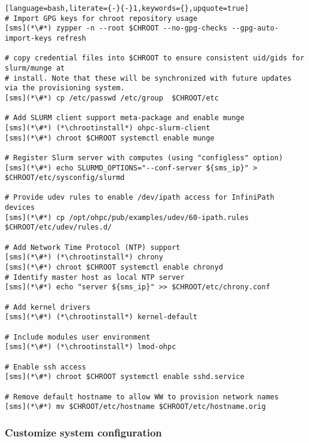 \documentclass[letterpaper]{article}
\newcommand{\chrootinstall}{zypper -n --root \$CHROOT install}
\begin{document}
\begin{lstlisting}[language=bash,literate={-}{-}1,keywords={},upquote=true]
# Import GPG keys for chroot repository usage
[sms](*\#*) zypper -n --root $CHROOT --no-gpg-checks --gpg-auto-import-keys refresh

# copy credential files into $CHROOT to ensure consistent uid/gids for slurm/munge at
# install. Note that these will be synchronized with future updates via the provisioning system.
[sms](*\#*) cp /etc/passwd /etc/group  $CHROOT/etc

# Add SLURM client support meta-package and enable munge
[sms](*\#*) (*\chrootinstall*) ohpc-slurm-client
[sms](*\#*) chroot $CHROOT systemctl enable munge

# Register Slurm server with computes (using "configless" option)
[sms](*\#*) echo SLURMD_OPTIONS="--conf-server ${sms_ip}" > $CHROOT/etc/sysconfig/slurmd

# Provide udev rules to enable /dev/ipath access for InfiniPath devices
[sms](*\#*) cp /opt/ohpc/pub/examples/udev/60-ipath.rules $CHROOT/etc/udev/rules.d/

# Add Network Time Protocol (NTP) support
[sms](*\#*) (*\chrootinstall*) chrony
[sms](*\#*) chroot $CHROOT systemctl enable chronyd
# Identify master host as local NTP server
[sms](*\#*) echo "server ${sms_ip}" >> $CHROOT/etc/chrony.conf

# Add kernel drivers
[sms](*\#*) (*\chrootinstall*) kernel-default

# Include modules user environment
[sms](*\#*) (*\chrootinstall*) lmod-ohpc

# Enable ssh access 
[sms](*\#*) chroot $CHROOT systemctl enable sshd.service

# Remove default hostname to allow WW to provision network names
[sms](*\#*) mv $CHROOT/etc/hostname $CHROOT/etc/hostname.orig
\end{lstlisting}

\vspace*{0.6cm}
\subsubsection{Customize system configuration} \label{sec:master_customization}



\end{document}
